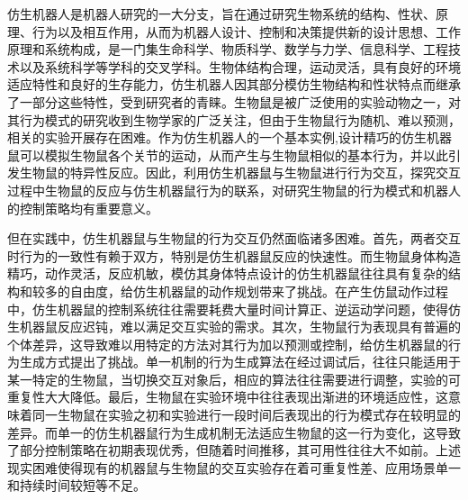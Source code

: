 仿生机器人是机器人研究的一大分支，旨在通过研究生物系统的结构、性状、原理、行为以及相互作用，从而为机器人设计、控制和决策提供新的设计思想、工作原理和系统构成\cite{sunFangShengXueDeXianZhuangHeWeiLai2007}，是一门集生命科学、物质科学、数学与力学、信息科学、工程技术以及系统科学等学科的交叉学科\cite{wangFangShengJiQiRenYanJiuXianZhuangYuFaZhanQuShi2015}。生物体结构合理，运动灵活，具有良好的环境适应特性和良好的生存能力，仿生机器人因其部分模仿生物结构和性状特点而继承了一部分这些特性，受到研究者的青睐\cite{shenFangShengJiQiRenYanJiuJinZhanJiFangShengJiGouYanJiu2015}。生物鼠是被广泛使用的实验动物之一\cite{kongShiYanDongWuPinXiShuJuKuDeJianLi2015}，对其行为模式的研究收到生物学家的广泛关注，但由于生物鼠行为随机、难以预测，相关的实验开展存在困难。作为仿生机器人的一个基本实例,设计精巧的仿生机器鼠可以模拟生物鼠各个关节的运动，从而产生与生物鼠相似的基本行为，并以此引发生物鼠的特异性反应\cite{gaoOverviewBiomimeticRobots2019}。因此，利用仿生机器鼠与生物鼠进行行为交互，探究交互过程中生物鼠的反应与仿生机器鼠行为的联系，对研究生物鼠的行为模式和机器人的控制策略均有重要意义\cite{frohnwieserUsingRobotsUnderstand2016}。

但在实践中，仿生机器鼠与生物鼠的行为交互仍然面临诸多困难。首先，两者交互时行为的一致性有赖于双方，特别是仿生机器鼠反应的快速性\cite{kleinRobotsServiceAnimal2012}。而生物鼠身体构造精巧，动作灵活，反应机敏，模仿其身体特点设计的仿生机器鼠往往具有复杂的结构和较多的自由度，给仿生机器鼠的动作规划带来了挑战。在产生仿鼠动作过程中，仿生机器鼠的控制系统往往需要耗费大量时间计算正、逆运动学问题，使得仿生机器鼠反应迟钝，难以满足交互实验的需求。其次，生物鼠行为表现具有普遍的个体差异\cite{BarnettSTheRat}，这导致难以用特定的方法对其行为加以预测或控制，给仿生机器鼠的行为生成方式提出了挑战。单一机制的行为生成算法在经过调试后，往往只能适用于某一特定的生物鼠，当切换交互对象后，相应的算法往往需要进行调整，实验的可重复性大大降低。最后，生物鼠在实验环境中往往表现出渐进的环境适应性，这意味着同一生物鼠在实验之初和实验进行一段时间后表现出的行为模式存在较明显的差异。而单一的仿生机器鼠行为生成机制无法适应生物鼠的这一行为变化，这导致了部分控制策略在初期表现优秀，但随着时间推移，其可用性往往大不如前。上述现实困难使得现有的机器鼠与生物鼠的交互实验存在着可重复性差、应用场景单一和持续时间较短等不足。

